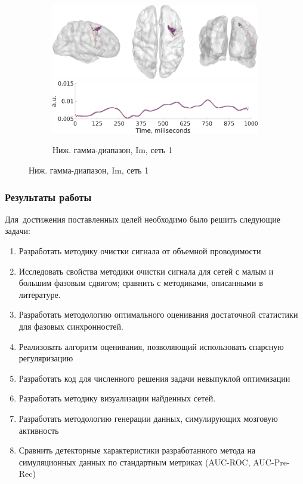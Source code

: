 \documentclass[12pt]{beamer}
\begin{document}
\begin{frame}[t]
\begin{figure}
     \begin{subfigure}[b]{0.4\textwidth}
     \includegraphics[width=\textwidth]{../images/psiicos_paper/Figure13_c1.jpg}
     \includegraphics[width=\textwidth]{../images/psiicos_paper/Figure13_c2.jpg}
     \caption{\tiny Ниж. гамма-диапазон, Im, сеть 1}\label{fig:13c}
     \end{subfigure}
    \end{figure} %
\end{frame}









\begin{frame}[t]
    \frametitle{Результаты работы}
    Для~достижения поставленных целей необходимо было решить следующие задачи:
    \begin{enumerate}
    \tiny
      \item Разработать методику очистки сигнала от объемной проводимости
      \item Исследовать свойства методики очистки сигнала
            для сетей с малым и большим фазовым сдвигом;
            сравнить с методиками, описанными в литературе.
      \item Разработать методологию оптимального оценивания достаточной статистики
            для фазовых синхронностей.
      \item Реализовать алгоритм оценивания, позволяющий использовать спарсную регуляризацию
      \item Разработать код для численного решения задачи невыпуклой оптимизации
      \item Разработать методику визуализации найденных сетей.
      \item Разработать методологию генерации данных, симулирующих мозговую активность
      \item Сравнить детекторные характеристики разработанного метода на симуляционных данных
            по стандартным метриках (AUC-ROC, AUC-Pre-Rec)
    \end{enumerate}
\end{frame}
\end{document}
